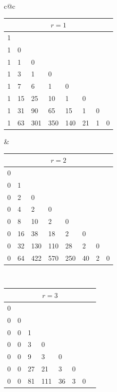 \documentclass[a4paper,11pt,UKenglish]{article}
\theoremstyle{definition}
\begin{document}
\begin{table}[ht]
\centering
\setlength{\tabcolsep}{3pt}
%
\begin{tabular}{c@{\hspace{0.5cm}}c}
\begin{tabular}{*{8}{p{1.5em}}}
\multicolumn{8}{c}{$r = 1$} \\
\toprule
 1 &   &   &   &   &   &   &   \\
 1 & 0 &   &   &   &   &   &   \\
 1 & 1 & 0 &   &   &   &   &   \\
 1 & 3 & 1 & 0 &   &   &   &   \\
 1 & 7 & 6 & 1 & 0 &   &   &   \\
 1 & 15 & 25 & 10 & 1 & 0 &   &   \\
 1 & 31 & 90 & 65 & 15 & 1 & 0 &   \\
 1 & 63 & 301 & 350 & 140 & 21 & 1 & 0 \\
\bottomrule
\end{tabular}
&
\begin{tabular}{*{8}{p{1.5em}}}
\multicolumn{8}{c}{$r = 2$} \\
\toprule
 0 &   &   &   &   &   &   &   \\
 0 & 1 &   &   &   &   &   &   \\
 0 & 2 & 0 &   &   &   &   &   \\
 0 & 4 & 2 & 0 &   &   &   &   \\
 0 & 8 & 10 & 2 & 0 &   &   &   \\
 0 & 16 & 38 & 18 & 2 & 0 &   &   \\
 0 & 32 & 130 & 110 & 28 & 2 & 0 &   \\
 0 & 64 & 422 & 570 & 250 & 40 & 2 & 0 \\
\bottomrule
\end{tabular}
\vspace{0.1cm}\\
\begin{tabular}{*{8}{p{1.5em}}}
\multicolumn{8}{c}{$r = 3$} \\
\toprule
 0 &   &   &   &   &   &   &   \\
 0 & 0 &   &   &   &   &   &   \\
 0 & 0 & 1 &   &   &   &   &   \\
 0 & 0 & 3 & 0 &   &   &   &   \\
 0 & 0 & 9 & 3 & 0 &   &   &   \\
 0 & 0 & 27 & 21 & 3 & 0 &   &   \\
 0 & 0 & 81 & 111 & 36 & 3 & 0 &   \\

\end{tabular}
\end{tabular}
\end{table}
\end{document}
